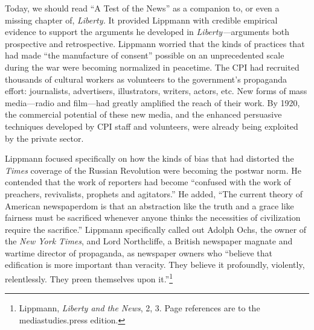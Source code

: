 \documentclass[openany,nobib,nohyper]{tufte-book}
\begin{document}
Today, we should read ``A Test of the News'' as a companion to, or even
a missing chapter of, \emph{Liberty.} It provided Lippmann with credible
empirical evidence to support the arguments he developed in
\emph{Liberty---}arguments both prospective and retrospective. Lippmann
worried that the kinds of practices that had made ``the manufacture of
consent'' possible on an unprecedented scale during the war were
becoming normalized in peacetime. The CPI had recruited thousands of
cultural workers as volunteers to the government's propaganda effort:
journalists, advertisers, illustrators, writers, actors, etc. New forms
of mass media---radio and film---had greatly amplified the reach of
their work. By 1920, the commercial potential of these new media, and
the enhanced persuasive techniques developed by CPI staff and
volunteers, were already being exploited by the private sector.

Lippmann focused specifically on how the kinds of bias that had
distorted the \emph{Times} coverage of the Russian Revolution were
becoming the postwar norm. He contended that the work of reporters had
become ``confused with the work of preachers, revivalists, prophets and
agitators.'' He added, ``The current theory of American newspaperdom is
that an abstraction like the truth and a grace like fairness must be
sacrificed whenever anyone thinks the necessities of civilization
require the sacrifice.'' Lippmann specifically called out Adolph Ochs,
the owner of the \emph{New York Times}, and Lord Northcliffe, a British
newspaper magnate and wartime director of propaganda, as newspaper
owners who ``believe that edification is more important than veracity.
They believe it profoundly, violently, relentlessly. They preen
themselves upon it.''\footnote{Lippmann, \emph{Liberty and the News}, 2, 3. Page references are
  to the mediastudies.press edition.}
\end{document}
